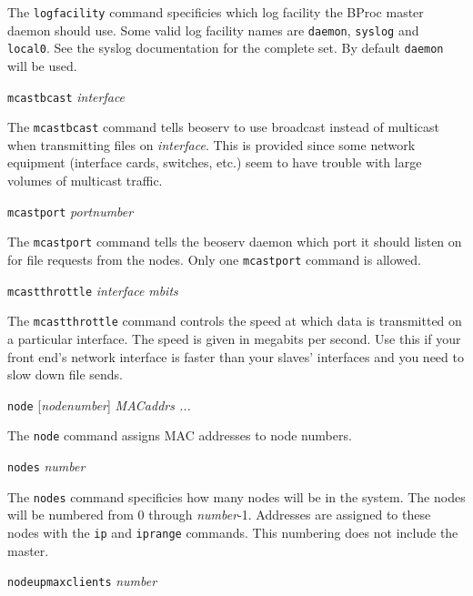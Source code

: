 \begin{description}
The \texttt{logfacility} command specificies which log facility the
BProc master daemon should use.  Some valid log facility names are
\texttt{daemon}, \texttt{syslog} and \texttt{local0}.  See the syslog
documentation for the complete set.  By default \texttt{daemon} will
be used.

\item{\texttt{mcastbcast} \emph{interface}}
\label{conf:mcastbcast}

The \texttt{mcastbcast} command tells beoserv to use broadcast instead
of multicast when transmitting files on \emph{interface}.  This is
provided since some network equipment (interface cards, switches,
etc.) seem to have trouble with large volumes of multicast traffic.

\item{\texttt{mcastport} \emph{portnumber}}
\label{conf:mcastport}

The \texttt{mcastport} command tells the beoserv daemon which port it
should listen on for file requests from the nodes.  Only one
\texttt{mcastport} command is allowed.

\item{\texttt{mcastthrottle} \emph{interface} \emph{mbits}}
\label{conf:mcastthrottle}

The \texttt{mcastthrottle} command controls the speed at which data is
transmitted on a particular interface.  The speed is given in megabits
per second.  Use this if your front end's network interface is faster
than your slaves' interfaces and you need to slow down file sends.

\item{\texttt{node} [\emph{nodenumber}] \emph{MACaddrs ...}}
\label{conf:node}

The \texttt{node} command assigns MAC addresses to node numbers.

\item{\texttt{nodes} \emph{number}}
\label{conf:nodes}

The \texttt{nodes} command specificies how many nodes will be in the
system.  The nodes will be numbered from 0 through \emph{number}-1.
Addresses are assigned to these nodes with the \texttt{ip} and
\texttt{iprange} commands.  This numbering does not include the
master.

\item{\texttt{nodeupmaxclients}} \emph{number}
\label{conf:nodeupmaxclients}


\end{description}
